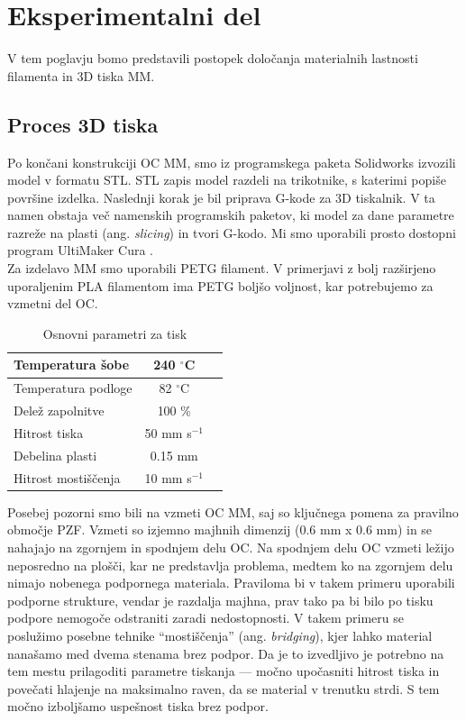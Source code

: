 \documentclass[12pt]{report}
\begin{document}
\chapter{Eksperimentalni del}
V tem poglavju bomo predstavili postopek določanja materialnih lastnosti filamenta in 3D tiska \ac{MM}.

\section{Proces 3D tiska}
Po končani konstrukciji \ac{OC} \ac{MM}, smo iz programskega paketa Solidworks \cite{solidworks} izvozili model v formatu STL. STL zapis model razdeli na trikotnike, s katerimi popiše površine izdelka. Naslednji korak je bil priprava G-kode za 3D tiskalnik. V ta namen obstaja več namenskih programskih paketov, ki model za dane parametre razreže na plasti (ang. \emph{slicing}) in tvori
G-kodo. Mi smo uporabili prosto dostopni program UltiMaker Cura \cite{cura}. \\
Za izdelavo \ac{MM} smo uporabili PETG filament. V primerjavi z bolj razširjeno uporaljenim PLA filamentom ima PETG boljšo voljnost, kar potrebujemo za vzmetni del \ac{OC}.

\begin{table}[H]
  \caption{Osnovni parametri za tisk}
  \centering
  \begin{tabular}{ | l | c | r | }
    \hline
    Temperatura šobe & 240 $^{\circ}$C \\ \hline
    Temperatura podloge & 82 $^{\circ}$C \\ \hline
    Delež zapolnitve & 100 \% \\ \hline
    Hitrost tiska & 50 mm s$^{-1}$ \\ \hline
    Debelina plasti & 0.15 mm \\ \hline
    Hitrost mostiščenja & 10 mm s$^{-1}$ \\
    \hline  
  \end{tabular}
\end{table}

\noindent Posebej pozorni smo bili na vzmeti \ac{OC} \ac{MM}, saj so ključnega pomena za pravilno območje \ac{PZF}. Vzmeti so izjemno majhnih dimenzij (0.6 mm x 0.6 mm) in se nahajajo na zgornjem
in spodnjem delu \ac{OC}. Na spodnjem delu \ac{OC} vzmeti ležijo neposredno na plošči, kar ne predstavlja problema, medtem ko na zgornjem delu nimajo nobenega podpornega materiala. Praviloma bi v takem
primeru uporabili podporne strukture, vendar je razdalja majhna, prav tako pa bi bilo po tisku podpore nemogoče odstraniti zaradi nedostopnosti. V takem primeru se poslužimo posebne tehnike ``mostiščenja'' (ang. \emph{bridging}), kjer lahko
material nanašamo med dvema stenama brez podpor. Da je to izvedljivo je potrebno na tem mestu prilagoditi parametre tiskanja --- močno upočasniti hitrost tiska in povečati hlajenje na maksimalno raven, da se material v trenutku strdi. S tem močno izboljšamo
uspešnost tiska brez podpor.
\end{document}
